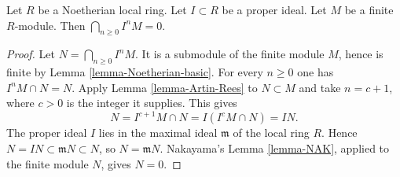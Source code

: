 \begin{lemma}
\label{lemma-intersect-powers-ideal-module-zero}
Let $R$ be a Noetherian local ring. Let $I \subset R$ be
a proper ideal. Let $M$ be a finite $R$-module.
Then $\bigcap_{n \geq 0} I^nM = 0$.
\end{lemma}

\begin{proof}
Let $N=\bigcap_{n\geq0}I^nM$. It is a submodule of the finite
module $M$, hence is finite by Lemma \ref{lemma-Noetherian-basic}.
For every $n\geq0$ one has $I^nM\cap N=N$.
Apply Lemma \ref{lemma-Artin-Rees} to $N\subset M$ and take
$n=c+1$, where $c>0$ is the integer it supplies. This gives
$$
N=I^{c+1}M\cap N=I(I^cM\cap N)=IN.
$$
The proper ideal $I$ lies in the maximal ideal $\mathfrak m$
of the local ring $R$. Hence
$N=IN\subset\mathfrak mN\subset N$, so
$N=\mathfrak mN$. Nakayama's Lemma \ref{lemma-NAK}, applied
to the finite module $N$, gives $N=0$.
\end{proof}